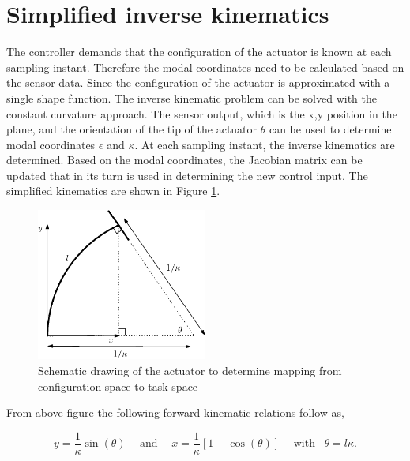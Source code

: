\label{app4}





\section{Simplified inverse kinematics}

The controller demands that the configuration of the actuator is known at each sampling instant. Therefore the modal coordinates need to be calculated based on the sensor data. Since the configuration of the actuator is approximated with a single shape function. The inverse kinematic problem can be solved with the constant curvature approach. The sensor output, which is the x,y position in the plane, and the orientation of the tip of the actuator $\theta$ can be used to determine modal coordinates $\epsilon$ and $\kappa$. At each sampling instant, the inverse kinematics are determined. Based on the modal coordinates, the Jacobian matrix can be updated that in its turn is used in determining the new control input. The simplified kinematics are shown in Figure \ref{fig:simpkin}.

\begin{figure}[H]
    \centering
    \includegraphics[width = 0.5\textwidth]{Figures/Chapter5/fbdkinematics.eps}
    \caption{Schematic drawing of the actuator to determine mapping from configuration space to task space}
    \label{fig:simpkin}
\end{figure}

From above figure the following forward kinematic relations follow as,


\begin{equation}
    y = \frac{1}{\kappa}\sin(\theta) \hspace{15pt} \text{and} \hspace{15pt}    x = \frac{1}{\kappa}[1-\cos(\theta)] \hspace{15pt} \text{with} \hspace{10pt}   \theta = l \kappa.
\end{equation}


